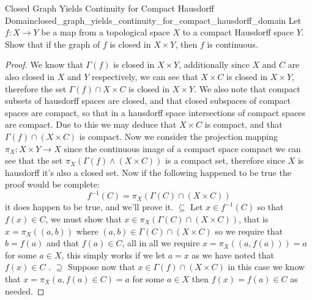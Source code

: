 \begin{proposition}
{Closed Graph Yields Continuity for Compact Hausdorff
Domain}{closed_graph_yields_continuity_for_compact_hausdorff_domain}
Let \(f: X \to  Y\) be a map from a topological space \(X\) to a
compact Hausdorff space \(Y\). Show that if the graph of \(f\) is closed in \(X
\times Y\), then \(f\) is continuous.
\end{proposition}
\begin{proof}
    We know that \( \Gamma \left( f \right)  \) is closed in \( X \times Y \),
    additionally since \( X \) and \( C \) are also closed in \( X \) and \( Y
    \) respectively, we can see that \(  X \times  C \) is closed in \( X \times
    Y\), therefore the set \( \Gamma \left( f \right) \cap X \times C \) is 
    closed in \( X \times Y \). We also note that compact subsets of hausdorff
    spaces are closed, and that closed subspaces of compact spaces are compact,
    so that in a hausdorff space intersections of compact spaces are compact.
    Due to this we may deduce that  \( X \times C \) is compact, and that \(
    \Gamma \left( f \right) \cap \left( X \times C \right)   \) is compact. Now
    we consider the projection mapping \( \pi _{ X }  : X \times Y \to X  \)
    since the continuous image of a compact space compact we can see that the
    set \( \pi _{ X } \left( \Gamma \left( f \right) \land  \left( X \times C
    \right)   \right)  \) is a compact set, therefore since \( X \) is
    hausdorff it's also a closed set. Now if the following happened to be true
    the proof would be complete:
    \[
    f ^{-1} \left( C \right) = \pi _{ X } \left( \Gamma \left( C \right) \cap
    \left( X \times C \right)  \right) 
    \]
    it does happen to be true, and we'll prove it. \( \subseteq  \) Let \( x \in
    f ^{-1} \left( C \right) \) so that \( f\left( x \right) \in  C \), we must
    show that \( x \in  \pi _{ X } \left( \Gamma \left( C \right) \cap \left( X
    \times C \right)  \right) \), that is \( x =  \pi _{ X } \left( \left( a, b
    \right)  \right)  \) where \( \left( a, b \right)  \in \Gamma \left( C \right) \cap \left( X
    \times C\right)  \) so we require that \( b = f\left( a \right)  \) and
    that \( f\left( a \right) \in  C \), all in all we require \( x =  \pi _{ X } \left(
    \left( a, f\left( a \right)  \right)  \right) = a \) for some \( a \in  X
    \), this simply works if we let \( a =  x \) as we have noted that \(
    f\left( x \right) \in  C \) . \( \supseteq  \) Suppose now that \( x \in
    \Gamma \left( f \right) \cap \left( X \times C \right)  \) in this case we
    know that \( x = \pi _{ X } \left( a, f\left( a \right) \in C  \right) = a  \) for
    some \( a \in  X \) then \( f\left( x \right) = f\left( a \right) \in C \)
    as needed.
\end{proof}
